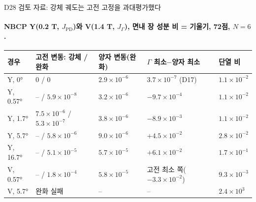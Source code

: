 \begin{frame}[label=d28-results]{D28 검토 자료: 강체 궤도는 고전 고정을 과대평가했다}
  \framesubtitle{NBCP Y(0.2 T, $J_{\mathrm{PD}}$)와 V(1.4 T, $J_\Gamma$), 면내 장 성분 비 = 기울기, 72점, $N=6$.}
  \footnotesize\renewcommand{\arraystretch}{1.08}
  \begin{tabularx}{\textwidth}{@{}P{1.9cm}P{2.3cm}P{2.3cm}P{2.1cm}Y@{}}
    \toprule
    경우 & 고전 변동: 강체 / 완화 & 양자 변동(완화) & $\Gamma$ 최소$-$양자 최소 & 단열 비 \\
    \midrule
    Y, 0° & 0 / 0 & $2.9\times10^{-6}$ & $3.7\times10^{-7}$ (D17) & $1.1\times10^{-2}$ \\
    Y, 0.57° & -- / $5.9\times10^{-8}$ & $3.2\times10^{-6}$ & $-9.7\times10^{-4}$ & $1.1\times10^{-2}$ \\
    Y, 1.7° & $7.5\times10^{-6}$ / $5.3\times10^{-7}$ & $3.8\times10^{-6}$ & $-8.9\times10^{-3}$ & $1.1\times10^{-2}$ \\
    Y, 5.7° & -- / $5.8\times10^{-6}$ & $9.0\times10^{-6}$ & $+4.5\times10^{-2}$ & $2.8\times10^{-2}$ \\
    Y, 16.7° & -- / $5.1\times10^{-5}$ & $5.7\times10^{-5}$ & $+6.1\times10^{-2}$ & $1.7\times10^{-1}$ \\
    V, 0.57° & -- / $1.8\times10^{-4}$ & $5.8\times10^{-5}$ & 고전 최소 쪽($-3.3\times10^{-2}$) & $9.3\times10^{-3}$ \\
    V, 5.7° & 완화 실패 & -- & -- & $2.4\times10^{3}$ \\
    \bottomrule
  \end{tabularx}
  \par\smallskip
\end{frame}

